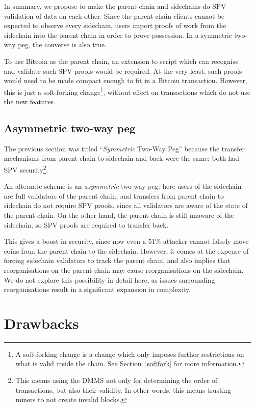 \documentclass[letterpaper]{article}
\newcommand{\mainchain}{parent chain\xspace}
\newcommand{\sidechain}{sidechain\xspace}
\newcommand{\sidechains}{sidechains\xspace}
\newcommand{\hashsig}{DMMS\xspace}
\begin{document}
In summary, we propose to make the \mainchain and \sidechains do SPV validation of
data on each other. Since the \mainchain clients cannot be expected
to observe every \sidechain, users import proofs of work from the \sidechain
into the \mainchain in order to prove possession. In a symmetric two-way peg,
the converse is also true.

To use Bitcoin as the \mainchain, an extension to script which can recognise and validate such SPV proofs
would be required. At the very least, such proofs would need to be made compact enough to fit in a Bitcoin transaction. 
However, this is just a soft-forking change\footnote{A soft-forking change is
a change which only imposes further restrictions on what is valid inside the chain. See Section~\ref{softfork} for more information.},
without effect on transactions which do not use the new features.

\subsection{Asymmetric two-way peg}

The previous section was titled ``\emph{Symmetric} Two-Way Peg'' because
the transfer mechanisms from \mainchain to \sidechain and back were the
same: both had SPV security\footnote{This means using the \hashsig not only for determining the order of transactions, but also their validity.
In other words, this means trusting miners to not create invalid blocks.}.

An alternate scheme is an \emph{asymmetric} two-way peg: here users of the
\sidechain are full validators of the \mainchain, and transfers from
\mainchain to \sidechain do not require SPV proofs, since all validators
are aware of the state of the \mainchain. On the other hand, the
\mainchain is still unaware of the \sidechain, so SPV proofs are required
to transfer back.

This gives a boost in security, since now even a 51\% attacker cannot
falsely move coins from the \mainchain to the \sidechain. However, it
comes at the expense of forcing \sidechain validators to track the
\mainchain, and also implies that reorganisations on the \mainchain
may cause reorganisations on the \sidechain. We do not explore this possibility in detail here, as issues surrounding reorganisations result in a significant expansion in complexity.

\section{Drawbacks}
\end{document}
